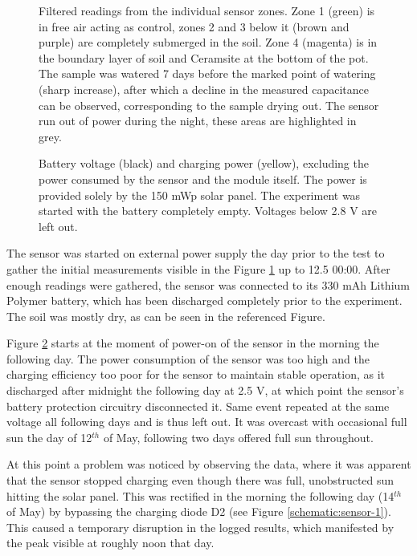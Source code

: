 \begin{figure}[p]
    
    \caption{\label{fig:sensor-log}Filtered readings from the individual sensor zones. Zone 1 (green) is in free air acting as control, zones 2 and 3 below it (brown and purple) are completely submerged in the soil. Zone 4 (magenta) is in the boundary layer of soil and Ceramsite at the bottom of the pot. The sample was watered 7 days before the marked point of watering (sharp increase), after which a decline in the measured capacitance can be observed, corresponding to the sample drying out. The sensor run out of power during the night, these areas are highlighted in grey.}
\end{figure}
\begin{figure}[p]
    
    \caption{\label{fig:power-log}Battery voltage (black) and charging power (yellow), excluding the power consumed by the sensor and the module itself. The power is provided solely by the 150 mWp solar panel. The experiment was started with the battery completely empty. Voltages below 2.8 V are left out.}
\end{figure}

The sensor was started on external power supply the day prior to the test to gather the initial measurements visible in the Figure \ref{fig:sensor-log} up to 12.5 00:00. After enough readings were gathered, the sensor was connected to its 330 mAh Lithium Polymer battery, which has been discharged completely prior to the experiment. The soil was mostly dry, as can be seen in the referenced Figure.

Figure \ref{fig:power-log} starts at the moment of power-on of the sensor in the morning the following day. The power consumption of the sensor was too high and the charging efficiency too poor for the sensor to maintain stable operation, as it discharged after midnight the following day at 2.5 V, at which point the sensor's battery protection circuitry disconnected it. Same event repeated at the same voltage all following days and is thus left out. It was overcast with occasional full sun the day of 12$^{th}$ of May, following two days offered full sun throughout.

At this point a problem was noticed by observing the data, where it was apparent that the sensor stopped charging even though there was full, unobstructed sun hitting the solar panel. This was rectified in the morning the following day (14$^{th}$ of May) by bypassing the charging diode D2 (see Figure \ref{schematic:sensor-1}). This caused a temporary disruption in the logged results, which manifested by the peak visible at roughly noon that day.

